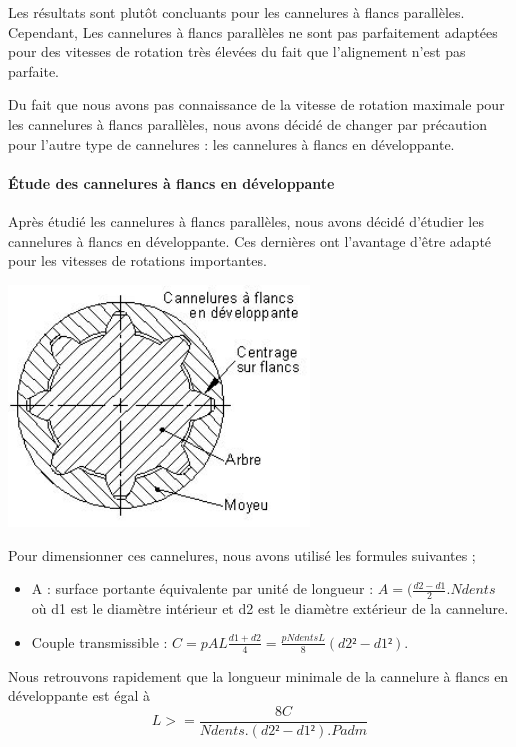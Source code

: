 \documentclass{config}
\begin{document}
\begin{spacing}{1.2}
Les résultats sont plutôt concluants pour les cannelures à flancs parallèles. Cependant, Les cannelures à flancs parallèles ne sont pas parfaitement adaptées pour des vitesses de rotation très élevées du fait que l'alignement n'est pas parfaite. 

Du fait que nous avons pas connaissance de la vitesse de rotation maximale pour les cannelures à flancs parallèles, nous avons décidé de changer par précaution pour l'autre type de cannelures : les cannelures à flancs en développante.

\paragraph{Étude des cannelures à flancs en développante \\}

Après étudié les cannelures à flancs parallèles, nous avons décidé d'étudier les cannelures à flancs en développante. Ces dernières ont l'avantage d'être adapté pour les vitesses de rotations importantes.

\begin{center}
\includegraphics[width=0.6\textwidth]{cannelure_developpante.jpg}
\end{center}

Pour dimensionner ces cannelures, nous avons utilisé les formules suivantes ;
\begin{itemize}
    \item A : surface portante équivalente par unité de longueur : $A = (\frac{d2-d1}{2}.Ndents$ où d1 est le diamètre intérieur et d2 est le diamètre extérieur de la cannelure.
    \item Couple transmissible : $C = p A L \frac{d1+d2}{4} = \frac{p Ndents L}{8} (d2² - d1²)$.
\end{itemize}
Nous retrouvons rapidement que la longueur minimale de la cannelure à flancs en développante est égal à 
\[ L >= \frac{8 C}{Ndents.(d2² - d1²). Padm}\]


\end{spacing}
\end{document}
